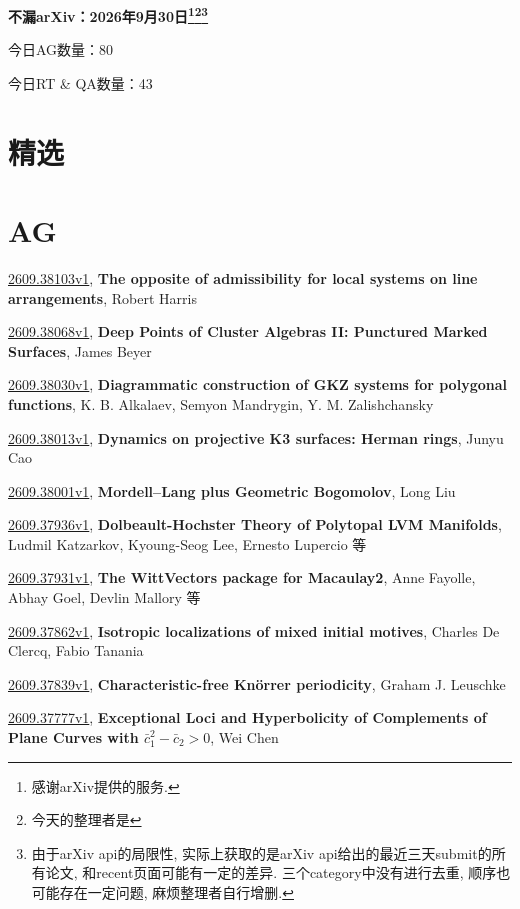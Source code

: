 \documentclass[9pt, a4paper]{article}
\theoremstyle{plain}
\theoremstyle{definition}
\theoremstyle{remark}
\newcommand{\arxiv}[3]{\href{https://arxiv.org/abs/#1}{#1}, \textbf{\textcolor{arxivblue}{#2}}, #3}
\newcommand{\AGnumber}{80}
\newcommand{\RTQAnumber}{43}
\newcommand{\NewestDate}{2026年9月30日}
\newcommand{\todayarXiver}{} %
\begin{document}
\begin{center}
    \Huge\textbf{不漏arXiv：\NewestDate\footnote{感谢arXiv提供的服务.}\footnote{今天的整理者是\todayarXiver}\footnote{由于arXiv api的局限性, 实际上获取的是arXiv api给出的最近三天submit的所有论文, 和recent页面可能有一定的差异. 三个category中没有进行去重, 顺序也可能存在一定问题, 麻烦整理者自行增删.}} \\
\end{center}

\setcounter{section}{-1}

\begin{center}
    今日AG数量：\AGnumber
    
    今日RT \& QA数量：\RTQAnumber
    
\end{center}


\section{精选}


\section{AG}
\arxiv{2609.38103v1}{The opposite of admissibility for local systems on line arrangements}{Robert Harris}

\arxiv{2609.38068v1}{Deep Points of Cluster Algebras II: Punctured Marked Surfaces}{James Beyer}

\arxiv{2609.38030v1}{Diagrammatic construction of GKZ systems for polygonal functions}{K. B. Alkalaev, Semyon Mandrygin, Y. M. Zalishchansky}

\arxiv{2609.38013v1}{Dynamics on projective K3 surfaces: Herman rings}{Junyu Cao}

\arxiv{2609.38001v1}{Mordell--Lang plus Geometric Bogomolov}{Long Liu}

\arxiv{2609.37936v1}{Dolbeault-Hochster Theory of Polytopal LVM Manifolds}{Ludmil Katzarkov, Kyoung-Seog Lee, Ernesto Lupercio 等}

\arxiv{2609.37931v1}{The WittVectors package for Macaulay2}{Anne Fayolle, Abhay Goel, Devlin Mallory 等}

\arxiv{2609.37862v1}{Isotropic localizations of mixed initial motives}{Charles De Clercq, Fabio Tanania}

\arxiv{2609.37839v1}{Characteristic-free Knörrer periodicity}{Graham J. Leuschke}

\arxiv{2609.37777v1}{Exceptional Loci and Hyperbolicity of Complements of Plane Curves with $\bar{c}_1^2 - \bar{c}_2 > 0$}{Wei Chen}
\end{document}
